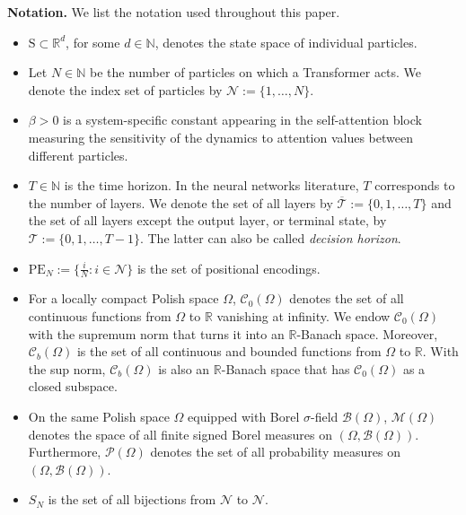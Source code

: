 \documentclass[11pt]{article}
\newcommand{\RR}{\mathbb{R}}
\newcommand{\NN}{\mathbb{N}}
\newcommand{\cB}{\mathcal{B}}
\newcommand{\cC}{\mathcal{C}}
\newcommand{\cM}{\mathcal{M}}
\newcommand{\cN}{\mathcal{N}}
\newcommand{\cP}{\mathcal{P}}
\newcommand{\cT}{\mathcal{T}}
\begin{document}
\noindent\textbf{Notation.} We list the notation used throughout this paper.
\begin{itemize}
    \item $\mathrm{S}\subset\RR^d$, for some $d\in\NN$, denotes the state space of individual particles.
    \item Let $N\in\NN$ be the number of particles on which a Transformer acts. We denote the index set of particles by $\cN := \{1,\ldots,N\}$.
    \item $\beta > 0$ is a system-specific constant appearing in the self-attention block measuring the sensitivity of the dynamics to attention values between different particles.
    \item $T\in\NN$ is the time horizon. In the neural networks literature, $T$ corresponds to the number of layers. We denote the set of all layers by $\overline{\cT} := \{0,1,\ldots,T\}$ and the set of all layers except the output layer, or terminal state, by $\cT := \{0,1,\ldots,T-1\}$. The latter can also be called \emph{decision horizon}.
    \item $\mathrm{PE}_N := \{\frac{i}{N} : i\in\cN\}$ is the set of positional encodings.
    \item For a locally compact Polish space $\Omega$, $\cC_0(\Omega)$ denotes the set of all continuous functions from $\Omega$ to $\RR$ vanishing at infinity. We endow $\cC_0(\Omega)$ with the supremum norm that turns it into an $\RR$-Banach space. Moreover, $\cC_b(\Omega)$ is the set of all continuous and bounded functions from $\Omega$ to $\RR$. With the sup norm, $\cC_b(\Omega)$ is also an $\RR$-Banach space that has $\cC_0(\Omega)$ as a closed subspace.
    \item On the same Polish space $\Omega$ equipped with Borel $\sigma$-field $\cB(\Omega)$, $\cM(\Omega)$ denotes the space of all finite signed Borel measures on $(\Omega, \cB(\Omega))$. Furthermore, $\cP(\Omega)$ denotes the set of all probability measures on $(\Omega, \cB(\Omega))$.
    \item $S_N$ is the set of all bijections from $\cN$ to $\cN$.
\end{itemize}
\end{document}
